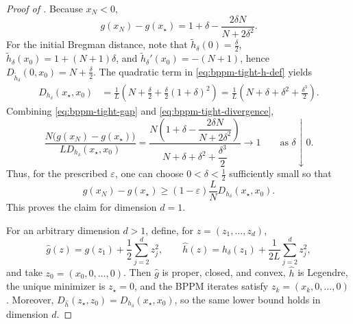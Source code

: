 \documentclass[10pt,a4paper]{amsart}
\newcommand{\bregprox}{g}
\begin{document}
\begin{proof}[Proof of ]
Because $x_N<0$,
\begin{equation}
    \bregprox(x_N)-\bregprox(x_\star)
    =
    1+\delta-\frac{2\delta N}{N+2\delta^2}.
    \label{eq:bppm-tight-gap}
\end{equation}
For the initial Bregman distance, note that $\widetilde h_\delta(0)=\frac{\delta}{2}$, $\widetilde h_\delta(x_0)=1+(N+1)\delta$, and $\widetilde h_\delta'(x_0)=-(N+1)$, hence $D_{\widetilde h_\delta}(0,x_0)=N+\frac{\delta}{2}$.
The quadratic term in \eqref{eq:bppm-tight-h-def} yields
\begin{equation}
\begin{aligned}
    D_{h_\delta}(x_\star,x_0)
    &=
    \frac{1}{L}\left(
        N+\frac{\delta}{2}
        +\frac{\delta}{2}(1+\delta)^2
    \right)
    =
    \frac{1}{L}\left(
        N+\delta+\delta^2+\frac{\delta^3}{2}
    \right).
\end{aligned}
\label{eq:bppm-tight-divergence}
\end{equation}
Combining \eqref{eq:bppm-tight-gap} and \eqref{eq:bppm-tight-divergence},
\[
\frac{N\bigl(\bregprox(x_N)-\bregprox(x_\star)\bigr)}
     {L D_{h_\delta}(x_\star,x_0)}
=
\frac{N\left(1+\delta-\dfrac{2\delta N}{N+2\delta^2}\right)}
     {N+\delta+\delta^2+\dfrac{\delta^3}{2}}
\longrightarrow 1
\qquad\text{as }\delta\downarrow0.
\]
Thus, for the prescribed $\varepsilon$, one can choose $0<\delta<\frac12$ sufficiently small so that
\[
    \bregprox(x_N)-\bregprox(x_\star)
    \ge
    (1-\varepsilon)\frac{L}{N}D_{h_\delta}(x_\star,x_0).
\]
This proves the claim for dimension $d=1$.

For an arbitrary dimension $d>1$, define, for $z=(z_1,\ldots,z_d)$,
\[
    \widehat{\bregprox}(z)=\bregprox(z_1)+\frac12\sum_{j=2}^d z_j^2,
    \qquad
    \widehat h(z)=h_\delta(z_1)+\frac{1}{2L}\sum_{j=2}^d z_j^2,
\]
and take $z_0=(x_0,0,\ldots,0)$.
Then $\widehat{\bregprox}$ is proper, closed, and convex, $\widehat h$ is Legendre, the unique minimizer is $z_\star=0$, and the BPPM iterates satisfy $z_k=(x_k,0,\ldots,0)$.
Moreover, $D_{\widehat h}(z_\star,z_0)=D_{h_\delta}(x_\star,x_0)$, so the same lower bound holds in dimension $d$.
\end{proof}
\end{document}

